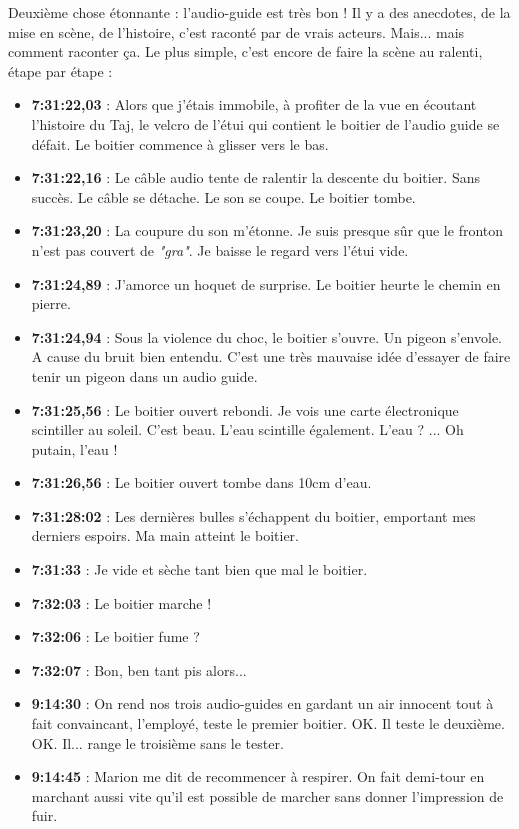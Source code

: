\documentclass{book}
\begin{document}
Deuxième chose étonnante : l'audio-guide est très bon ! Il y a des anecdotes, de la mise en scène, de l'histoire, c'est raconté par de vrais acteurs. Mais... mais comment raconter ça. Le plus simple, c'est encore de faire la scène au ralenti, étape par étape :
\begin{itemize}
	\item \textbf{7:31:22,03} : Alors que j'étais immobile, à profiter de la vue en écoutant l'histoire du Taj, le velcro de l'étui qui contient le boitier de l'audio guide se défait. Le boitier commence à glisser vers le bas.
	\item \textbf{7:31:22,16} : Le câble audio tente de ralentir la descente du boitier. Sans succès. Le câble se détache. Le son se coupe. Le boitier tombe.
	\item \textbf{7:31:23,20} : La coupure du son m'étonne. Je suis presque sûr que le fronton n'est pas couvert de \emph{"gra"}. Je baisse le regard vers l'étui vide.
	\item \textbf{7:31:24,89} : J'amorce un hoquet de surprise. Le boitier heurte le chemin en pierre.
	\item \textbf{7:31:24,94} : Sous la violence du choc, le boitier s'ouvre. Un pigeon s'envole. A cause du bruit bien entendu. C'est une très mauvaise idée d'essayer de faire tenir un pigeon dans un audio guide.
	\item \textbf{7:31:25,56} : Le boitier ouvert rebondi. Je vois une carte électronique scintiller au soleil. C'est beau. L'eau scintille également. L'eau ? ... Oh putain, l'eau !
	\item \textbf{7:31:26,56} : Le boitier ouvert tombe dans 10cm d'eau.
	\item \textbf{7:31:28:02} : Les dernières bulles s'échappent du boitier, emportant mes derniers espoirs. Ma main atteint le boitier.
	\item \textbf{7:31:33} : Je vide et sèche tant bien que mal le boitier.
	\item \textbf{7:32:03} : Le boitier marche !
	\item \textbf{7:32:06} : Le boitier fume ?
	\item \textbf{7:32:07} : Bon, ben tant pis alors...
	\item \textbf{9:14:30} : On rend nos trois audio-guides en gardant un air innocent tout à fait convaincant, l'employé, teste le premier boitier. OK. Il teste le deuxième. OK. Il... range le troisième sans le tester.
	\item \textbf{9:14:45} : Marion me dit de recommencer à respirer. On fait demi-tour en marchant aussi vite qu'il est possible de marcher sans donner l'impression de fuir.
\end{itemize}
\end{document}
